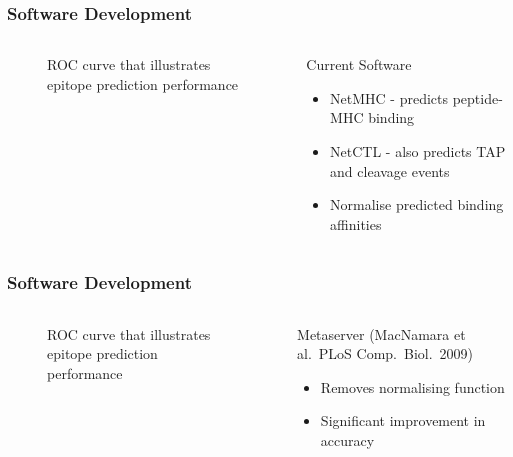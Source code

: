\documentclass[slidescentered,compress]{beamer}
\begin{document}
\frame
{
\frametitle{Software Development}

\begin{columns}[c]

\begin{column}{5cm}
\begin{figure}
	\caption{ROC curve that illustrates epitope prediction performance}
\end{figure}
\end{column}

\begin{column}{5cm}

Current Software

\begin{itemize}
\item NetMHC - predicts peptide-MHC binding
\item NetCTL - also predicts TAP and cleavage events
\item Normalise predicted binding affinities
\end{itemize}
\end{column}
\end{columns}

}

\frame
{
\frametitle{Software Development}

\begin{columns}[c]

\begin{column}{5cm}
\begin{figure}
	\caption{ROC curve that illustrates epitope prediction performance}
\end{figure}
\end{column}

\begin{column}{5cm}

Metaserver (MacNamara et al.~PLoS Comp.~Biol.~2009)

\begin{itemize}
\item Removes normalising function	
\item Significant improvement in accuracy
\end{itemize}
\end{column}
\end{columns}

}
\end{document}
